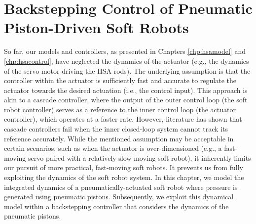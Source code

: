 \chapter{Backstepping Control of Pneumatic Piston-Driven Soft Robots}
\label{chp:backstepping}

\begin{foreword}
    So far, our models and controllers, as presented in Chapters \ref{chp:hsamodel} and \ref{chp:hsacontrol}, have neglected the dynamics of the actuator (e.g., the dynamics of the servo motor driving the \gls{HSA} rods). The underlying assumption is that the controller within the actuator is sufficiently fast and accurate to regulate the actuator towards the desired actuation (i.e., the control input). This approach is akin to a cascade controller, where the output of the outer control loop (the soft robot controller) serves as a reference to the inner control loop (the actuator controller), which operates at a faster rate.
    However, literature has shown that cascade controllers fail when the inner closed-loop system cannot track its reference accurately. While the mentioned assumption may be acceptable in certain scenarios, such as when the actuator is over-dimensioned (e.g., a fast-moving servo paired with a relatively slow-moving soft robot), it inherently limits our pursuit of more practical, fast-moving soft robots. It prevents us from fully exploiting the dynamics of the soft robot system.
    In this chapter, we model the integrated dynamics of a pneumatically-actuated soft robot where pressure is generated using pneumatic pistons. Subsequently, we exploit this dynamical model within a backstepping controller that considers the dynamics of the pneumatic pistons.
\end{foreword}

\pagebreak

